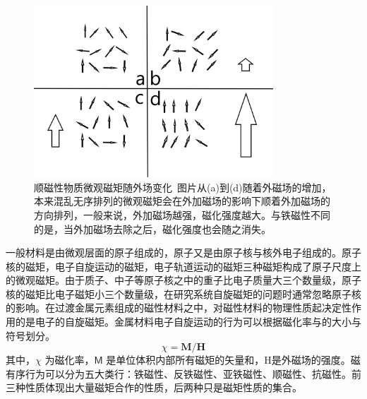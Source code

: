 \begin{figure}[h]
    \centering
\includegraphics[width=0.8\textwidth]{./pic/005.png}
\caption{顺磁性物质微观磁矩随外场变化\ 图片从(a)到(d)随着外磁场的增加，本来混乱无序排列的微观磁矩会在外加磁场的影响下顺着外加磁场的方向排列，一般来说，外加磁场越强，磁化强度越大。与铁磁性不同的是，当外加磁场去除之后，磁化强度也会随之消失。}

\label{dog005}
\end{figure}

一般材料是由微观层面的原子组成的，原子又是由原子核与核外电子组成的。原子核的磁矩，电子自旋运动的磁矩，电子轨道运动的磁矩三种磁矩构成了原子尺度上的微观磁矩。由于质子、中子等原子核之中的重子比电子质量大三个数量级，原子核的磁矩比电子磁矩小三个数量级，在研究系统自旋磁矩的问题时通常忽略原子核的影响。\cite{王克锋2008单相多铁性材料}在过渡金属元素组成的磁性材料之中，对磁性材料的物理性质起决定性作用的是电子的自旋磁矩。金属材料电子自旋运动的行为可以根据磁化率与的大小与符号划分。
$$\chi =\mathbf{M} /\mathbf{H} $$ 
其中，$\chi$ 为磁化率，$\mathsf{M}$ 是单位体积内部所有磁矩的矢量和，H是外磁场的强度。磁有序行为可以分为五大类行：铁磁性、反铁磁性、亚铁磁性、顺磁性、抗磁性。前三种性质体现出大量磁矩合作的性质，后两种只是磁矩性质的集合。


